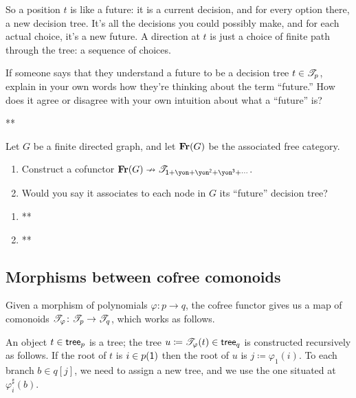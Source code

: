\documentclass[Book-Poly]{subfiles}
\begin{document}
So a position $t$ is like a future: it is a current decision, and for every option there, a new decision tree. It's all the decisions you could possibly make, and for each actual choice, it's a new future. A direction at $t$ is just a choice of finite path through the tree: a sequence of choices. 

\begin{exercise}
If someone says that they understand a future to be a decision tree $t\in\mathscr{T}_{p}$, explain in your own words how they're thinking about the term ``future.'' How does it agree or disagree with your own intuition about what a ``future'' is?
\begin{solution}
**
\end{solution}
\end{exercise}

\begin{exercise}
Let $G$ be a finite directed graph, and let $\mathbf{Fr}(G)$ be the associated free category. 
\begin{enumerate}
	\item Construct a cofunctor $\Cat{Fr}(G)\cof\cofree{\1+\yon+\yon^\2+\yon^\3+\cdots}$.
	\item Would you say it associates to each node in $G$ its ``future'' decision tree?
\qedhere
\end{enumerate}
\begin{solution}
\begin{enumerate}
    \item **
    \item **
\end{enumerate}
\end{solution}
\end{exercise}

\subsection{Morphisms between cofree comonoids}
Given a morphism of polynomials $\varphi \colon p \to q$, the cofree functor gives us a map of comonoids $\mathscr{T}_{\varphi} \colon \mathscr{T}_{p} \to \mathscr{T}_{q}$, which works as follows.

An object $t \in \mathsf{tree}_p$ is a tree; the tree $u \coloneqq \mathscr{T}_{\varphi} (t) \in \mathsf{tree}_q $ is constructed recursively as follows. If the root of $t$ is $i \in p(\textsf{1})$ then the root of $u$ is $j \coloneqq \varphi_1 (i)$. To each branch $b \in q[j]$, we need to assign a new tree, and we use the one situated at $\varphi_i ^ \sharp (b)$.
\end{document}
